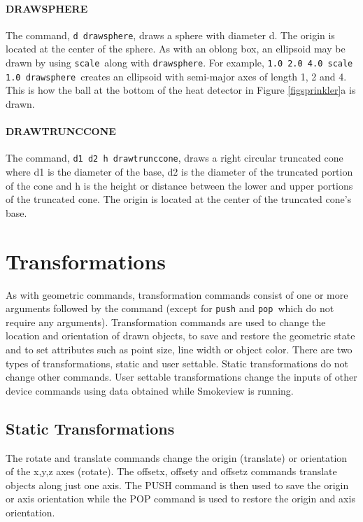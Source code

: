 \documentclass[11pt,twoside]{book}
\begin{document}
\paragraph{DRAWSPHERE} The command, {\tt d drawsphere},
draws a sphere with diameter d.  The origin is located at the
center of the sphere. As with an oblong box, an ellipsoid may be
drawn by using {\tt scale}\ along with {\tt drawsphere}. For
example, {\tt 1.0 2.0 4.0 scale 1.0 drawsphere}\ creates an
ellipsoid with semi-major axes of length 1, 2 and 4. This is how
the ball at the bottom of the heat detector in Figure \ref{figsprinkler}a is drawn.

\newpage
{}
\paragraph{DRAWTRUNCCONE} The command, {\tt d1 d2 h drawtrunccone},
draws a right circular truncated cone where d1 is the diameter of
the base, d2 is the diameter of the truncated portion of the cone
and h is the height or distance between the lower and upper
portions of the truncated cone.  The origin is located at the
center of the truncated cone's base.

\vspace{0.75in}
\section{Transformations}
As with geometric commands, transformation commands consist of one
or more arguments followed by the command (except for {\tt push}
and {\tt pop}\ which do not require any arguments). Transformation
commands are used to change the location and orientation of drawn
objects, to save and restore the geometric state and to set
attributes such as point size, line width or object color.
There are two types of transformations, static and user settable.
Static transformations
do not change other commands.  User settable transformations
change the inputs of other device commands using data obtained while Smokeview is running.


\subsection{Static Transformations}
The
rotate and translate commands change the origin (translate) or
orientation of the x,y,z axes (rotate). The offsetx, offsety and offsetz commands translate
objects along just one axis.  The PUSH command is then
used to save the origin or axis orientation while the POP command
is used to restore the origin and axis orientation.
\end{document}
